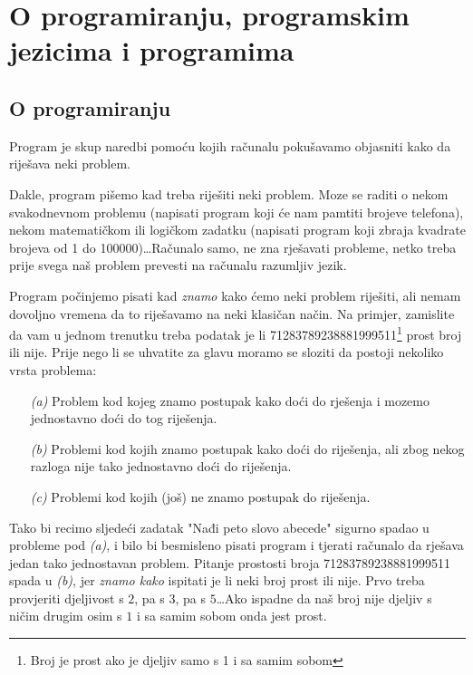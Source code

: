 \chapter{O programiranju, programskim jezicima i programima}

\section{O programiranju}

	Program je skup naredbi pomoću kojih računalu pokušavamo objasniti kako
	da riješava neki problem.

	Dakle, program pišemo kad treba riješiti neki
	problem. Moze se raditi o nekom
	svakodnevnom problemu (napisati program koji će nam pamtiti brojeve telefona),
	nekom matematičkom ili logičkom zadatku (napisati program
	koji zbraja kvadrate brojeva od 1 do 100000)\dots Računalo samo, ne zna
	rješavati probleme, netko treba prije svega naš problem prevesti na 
	računalu razumljiv jezik.

	Program počinjemo pisati kad \emph{znamo} kako ćemo neki problem
	riješiti, ali nemam dovoljno vremena da to riješavamo na neki klasičan
	način. Na primjer, zamislite da vam u jednom trenutku treba podatak je li
	71283789238881999511\footnote{Broj je prost ako je djeljiv samo s 1 i sa samim sobom} prost broj ili nije. Prije nego li se uhvatite za glavu moramo
	se sloziti da postoji nekoliko vrsta problema:

	\begin{itemize}
		\item[\emph{(a)}] Problem kod kojeg znamo postupak kako doći do rješenja i
			mozemo jednostavno doći do tog riješenja.
		\item[\emph{(b)}] Problemi kod kojih znamo postupak kako doći do 
			riješenja, ali zbog
			nekog razloga nije tako jednostavno doći do riješenja.
		\item[\emph{(c)}] Problemi kod kojih (još) ne znamo postupak do riješenja.
	\end{itemize}

	Tako bi recimo sljedeći zadatak "Nađi peto slovo abecede" sigurno spadao u 
	probleme pod \emph{(a)}, i bilo bi besmisleno pisati program i tjerati računalo
	da rješava jedan tako jednostavan problem. Pitanje prostosti broja 
	71283789238881999511 spada u \emph{(b)}, jer \emph{znamo kako} ispitati je li neki
	broj prost ili nije. Prvo treba provjeriti djeljivost s $2$, pa s $3$, pa s
	$5$\dots Ako ispadne da naš broj nije djeljiv s ničim drugim osim s $1$ i
	sa samim sobom onda jest prost. 

